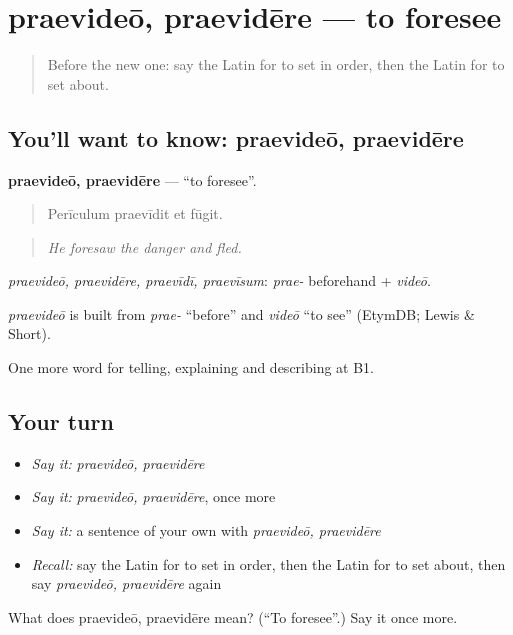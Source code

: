 \section[praevideō, praevidēre]{praevideō, praevidēre — to foresee}

\label{lesson:LA-C394-praevideo}



\begin{quote}
Before the new one: say the Latin for to set in order, then the Latin for to set about.
\end{quote}

\subsection*{You'll want to know: praevideō, praevidēre}
\textbf{praevideō, praevidēre} — \textquotedblleft{}to foresee\textquotedblright{}.

\begin{quote}
Perīculum praevīdit et fūgit.
\end{quote}

\begin{quote}
\emph{He foresaw the danger and fled.}
\end{quote}

\emph{praevideō, praevidēre, praevīdī, praevīsum}: \emph{prae-} beforehand + \emph{videō}.

\begin{cousinweb}
\emph{praevideō} is built from \emph{prae-} \textquotedblleft{}before\textquotedblright{} and \emph{videō} \textquotedblleft{}to see\textquotedblright{} (EtymDB; Lewis \& Short).
\end{cousinweb}

\begin{grammarlens}[title={What you've built}]
One more word for telling, explaining and describing at B1.
\end{grammarlens}

\subsection*{Your turn}
\begin{itemize}
\raggedright
  \item \emph{Say it:} \emph{praevideō, praevidēre}
  \item \emph{Say it:} \emph{praevideō, praevidēre}, once more
  \item \emph{Say it:} a sentence of your own with \emph{praevideō, praevidēre}
  \item \emph{Recall:} say the Latin for to set in order, then the Latin for to set about, then say \emph{praevideō, praevidēre} again
\end{itemize}

\begin{tcolorbox}[breakable,colback=teal!4,colframe=teal!35!black,title={Before you move on}]
What does praevideō, praevidēre mean? (\textquotedblleft{}To foresee\textquotedblright{}.) Say it once more.
\end{tcolorbox}
